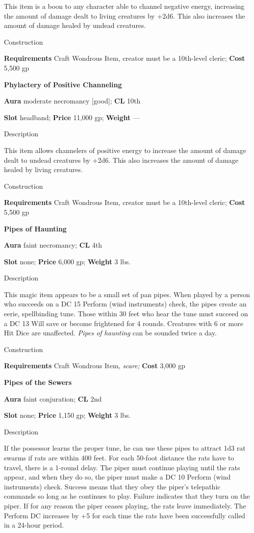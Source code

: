 This item is a boon to any character able to channel negative energy, increasing the amount of damage dealt to living creatures by +2d6. This also increases the amount of damage healed by undead creatures.
				
Construction
				
\textbf{Requirements }Craft Wondrous Item, creator must be a 10th-level cleric; \textbf{Cost} 5,500 gp
				
\textbf{Phylactery of Positive Channeling}
				
\textbf{Aura} moderate necromancy \mbox{$[$}good\mbox{$]$}; \textbf{CL} 10th
				
\textbf{Slot }headband; \textbf{Price} 11,000 gp; \textbf{Weight} ---
				
Description
				
This item allows channelers of positive energy to increase the amount of damage dealt to undead creatures by +2d6. This also increases the amount of damage healed by living creatures.
				
Construction
				
\textbf{Requirements }Craft Wondrous Item, creator must be a 10th-level cleric; \textbf{Cost} 5,500 gp
				
\textbf{Pipes of Haunting}
				
\textbf{Aura} faint necromancy;\textbf{ CL }4th
				
\textbf{Slot} none; \textbf{Price} 6,000 gp; \textbf{Weight} 3 lbs.
				
Description
				
This magic item appears to be a small set of pan pipes. When played by a person who succeeds on a DC 15 Perform (wind instruments) check, the pipes create an eerie, spellbinding tune. Those within 30 feet who hear the tune must succeed on a DC 13 Will save or become frightened for 4 rounds. Creatures with 6 or more Hit Dice are unaffected. \textit{Pipes of haunting} can be sounded twice a day. 
				
Construction
				
\textbf{Requirements} Craft Wondrous Item,\textit{ scare;}\textbf{ Cost }3,000 gp
				
\textbf{Pipes of the Sewers}
				
\textbf{Aura} faint conjuration;\textbf{ CL }2nd
				
\textbf{Slot} none; \textbf{Price} 1,150 gp; \textbf{Weight} 3 lbs.
				
Description
				
If the possessor learns the proper tune, he can use these pipes to attract 1d3 rat swarms if rats are within 400 feet. For each 50-foot distance the rats have to travel, there is a 1-round delay. The piper must continue playing until the rats appear, and when they do so, the piper must make a DC 10 Perform (wind instruments) check. Success means that they obey the piper's telepathic commands so long as he continues to play. Failure indicates that they turn on the piper. If for any reason the piper ceases playing, the rats leave immediately. The Perform DC increases by +5 for each time the rats have been successfully called in a 24-hour period.
				

